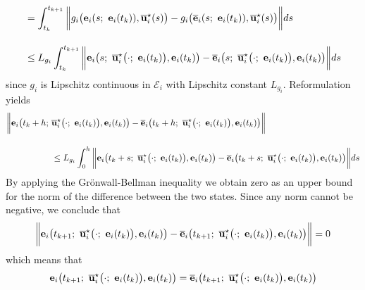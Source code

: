 \begin{gg_box}
\begin{align}
  &=\int_{t_k}^{t_{k+1}} \bigg\| g_i\big(\vect{e}_i(s;\ \vect{e}_i(t_k)), \overline{\vect{u}}_i^{\star}(s)\big)
  - g_i\big(\overline{\vect{e}}_i(s;\ \vect{e}_i(t_k)), \overline{\vect{u}}_i^{\star}(s)\big) \bigg\| ds\\[2.5ex]
  &\leq L_{g_i}\int_{t_k}^{t_{k+1}} \bigg\|
    \vect{e}_i\big(s;\ \overline{\vect{u}}_i^{\star}\big(\cdot;\ \vect{e}_i(t_k)\big), \vect{e}_i(t_k)\big)
    -\overline{\vect{e}}_i\big(s;\ \overline{\vect{u}}_i^{\star}\big(\cdot;\ \vect{e}_i(t_k)\big), \vect{e}_i(t_k)\big) \bigg\| ds
\end{align}
since $g_i$ is Lipschitz continuous in $\mathcal{E}_i$ with Lipschitz constant
$L_{g_i}$. Reformulation yields
\begin{align}
  \bigg\|\vect{e}_i\big(t_k+h;\ &\overline{\vect{u}}_i^{\star}\big(\cdot;\ \vect{e}_i(t_k)\big), \vect{e}_i(t_k)\big)
    -\overline{\vect{e}}_i\big(t_k+h;\ \overline{\vect{u}}_i^{\star}\big(\cdot;\ \vect{e}_i(t_k)\big), \vect{e}_i(t_k)\big) \bigg\| \\[2.5ex]
  &\leq L_{g_i}\int_{0}^{h} \bigg\|
    \vect{e}_i\big(t_k + s;\ \overline{\vect{u}}_i^{\star}\big(\cdot;\ \vect{e}_i(t_k)\big), \vect{e}_i(t_k)\big)
    -\overline{\vect{e}}_i\big(t_k + s;\ \overline{\vect{u}}_i^{\star}\big(\cdot;\ \vect{e}_i(t_k)\big), \vect{e}_i(t_k)\big) \bigg\| ds
\end{align}
By applying the Gr\"{o}nwall-Bellman inequality we obtain zero as an
upper bound for the norm of the difference between the two states. Since
any norm cannot be negative, we conclude that
\begin{align}
  \bigg\|\vect{e}_i\big(t_{k+1};\ \overline{\vect{u}}_i^{\star}\big(\cdot;\ \vect{e}_i(t_k)\big), \vect{e}_i(t_k)\big)
    -\overline{\vect{e}}_i\big(t_{k+1};\ \overline{\vect{u}}_i^{\star}\big(\cdot;\ \vect{e}_i(t_k)\big), \vect{e}_i(t_k)\big) \bigg\| = 0
\end{align}
which means that
\begin{align}
  \vect{e}_i\big(t_{k+1};\ \overline{\vect{u}}_i^{\star}\big(\cdot;\ \vect{e}_i(t_k)\big), \vect{e}_i(t_k)\big)
    =\overline{\vect{e}}_i\big(t_{k+1};\ \overline{\vect{u}}_i^{\star}\big(\cdot;\ \vect{e}_i(t_k)\big), \vect{e}_i(t_k)\big)
\end{align}


\end{gg_box}
